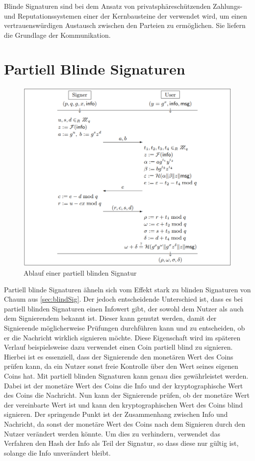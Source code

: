 \documentclass[
	fontsize=12pt,
	headings=small,
	parskip=half,           %
	bibliography=totoc,
	numbers=noenddot,       %
	open=any,               %
]{scrreprt}
\begin{document}
Blinde Signaturen sind bei dem Ansatz von privatsphäreschützenden Zahlungs- und Reputationssystemen einer der Kernbausteine der verwendet wird, um einen vertrauenswürdigen Austausch zwischen den Parteien zu ermöglichen. Sie liefern die Grundlage der Kommunikation.

\section{Partiell Blinde Signaturen}
\label{sec:partBlindSig}
\begin{figure}[h]
    \label{fig:partBlindSig}
    \centering
    \includegraphics*[width=1\textwidth]{partBlindSig.png}
    \caption{Ablauf einer partiell blinden Signatur \cite{abe2000provably}}
\end{figure}
Partiell blinde Signaturen ähneln sich vom Effekt stark zu blinden Signaturen von Chaum aus \ref{sec:blindSig}. Der jedoch entscheidende Unterschied ist, dass es bei partiell blinden Signaturen einen Infowert gibt, der sowohl dem Nutzer als auch dem Signierendem bekannt ist. Dieser kann genutzt werden, damit der Signierende möglicherweise Prüfungen durchführen kann und zu entscheiden, ob er die Nachricht wirklich signieren möchte. Diese Eigenschaft wird im späteren Verlauf beispielsweise dazu verwendet einen Coin partiell blind zu signieren. Hierbei ist es essenziell, dass der Signierende den monetären Wert des Coins prüfen kann, da ein Nutzer sonst freie Kontrolle über den Wert seines eigenen Coins hat. Mit partiell blinden Signaturen kann genau dies gewährleistet werden. Dabei ist der monetäre Wert des Coins die Info und der kryptographische Wert des Coins die Nachricht. Nun kann der Signierende prüfen, ob der monetäre Wert der vereinbarte Wert ist und kann den kryptographischen Wert des Coins blind signieren. Der springende Punkt ist der Zusammenhang zwischen Info und Nachricht, da sonst der monetäre Wert des Coins nach dem Signieren durch den Nutzer verändert werden könnte. Um dies zu verhindern, verwendet das Verfahren den Hash der Info als Teil der Signatur, so dass diese nur gültig ist, solange die Info unverändert bleibt.
\end{document}
